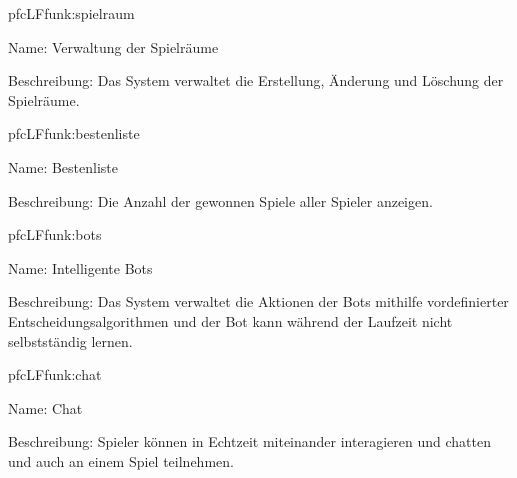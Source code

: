\begin{description}[leftmargin=5em, style=sameline]
	\begin{lhp}{pfc}{LF}{funk:spielraum}
		\item [Name:] Verwaltung der Spielräume
		\item [Beschreibung:] Das System verwaltet die Erstellung, Änderung und Löschung der Spielräume.
	\end{lhp}
	
	\begin{lhp}{pfc}{LF}{funk:bestenliste}
		\item [Name:] Bestenliste
		\item [Beschreibung:] Die Anzahl der gewonnen Spiele aller Spieler anzeigen.
	\end{lhp}
	
	\begin{lhp}{pfc}{LF}{funk:bots}
		\item [Name:] Intelligente Bots
		\item [Beschreibung:] Das System verwaltet die Aktionen der Bots mithilfe vordefinierter Entscheidungsalgorithmen und der Bot kann während der Laufzeit nicht selbstständig lernen.
	\end{lhp}
	
	\begin{lhp}{pfc}{LF}{funk:chat}
		\item [Name:] Chat
		\item [Beschreibung:] Spieler können in Echtzeit miteinander interagieren und chatten und auch an einem Spiel teilnehmen.
	\end{lhp}

\end{description}


